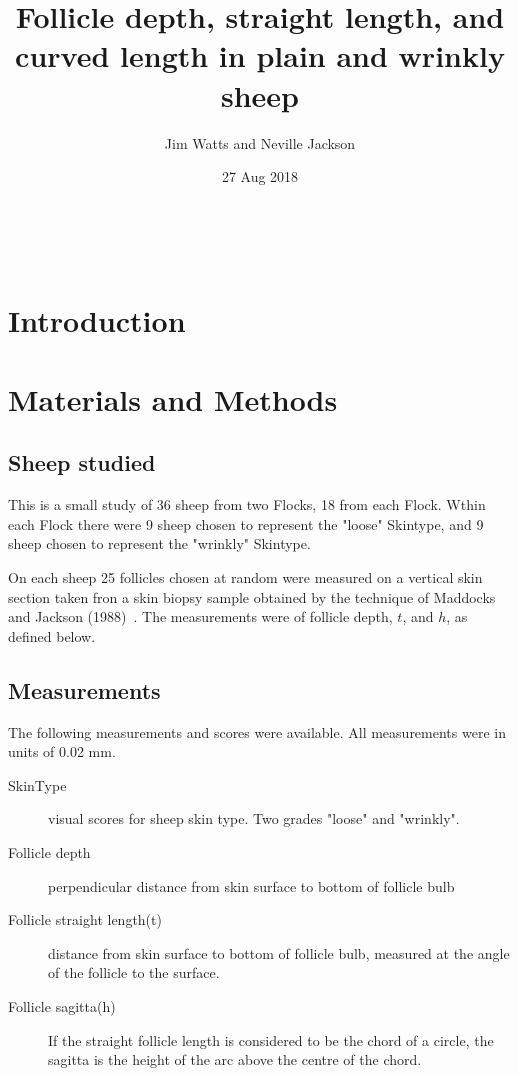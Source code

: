\documentclass[titlepage]{article}  %
\title{Follicle depth, straight length, and curved length in plain and wrinkly sheep}
\author{Jim Watts and Neville Jackson}
\date{27 Aug 2018}
\begin{document}
 


 
\maketitle      
\tableofcontents

$\newcommand{\E}{\mathrm{E}}$
$\newcommand{\Var}{\mathrm{Var}}$
$\newcommand{\Cov}{\mathrm{Cov}}$ 
$\newcommand{\SD}{\mathrm{SD}}$ 

\clearpage
\section{Introduction} 

\section{Materials and Methods}
\subsection{Sheep studied}
This is a small study of 36 sheep from two Flocks, 18 from each Flock. Wthin each Flock there were 9 sheep chosen to represent the "loose" Skintype, and 9 sheep chosen to represent the "wrinkly" Skintype. 

On each sheep 25 follicles chosen at random were measured on a vertical skin section taken fron a skin biopsy sample obtained by the technique of Maddocks and Jackson (1988)~\cite{madd:88}. The measurements were of follicle depth, $t$, and $h$, as defined below.

\subsection{Measurements}
The following measurements and scores were available. All measurements were in units of 0.02 mm. 
\begin{description}
\item[SkinType] visual scores for sheep skin type. Two grades "loose" and "wrinkly". 
\item[Follicle depth] perpendicular distance from skin surface to bottom of follicle bulb
\item[Follicle straight length(t)] distance from skin surface to bottom of follicle bulb, measured at the angle of the follicle to the surface.
\item[Follicle sagitta(h)] If the straight follicle length is considered to be the chord of a circle, the sagitta is the height of the arc above the centre of the chord.
\end{description}
\end{document}
